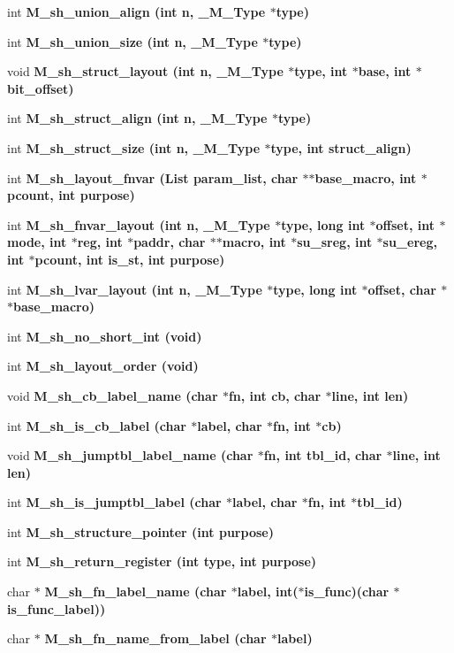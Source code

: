 \begin{CompactItemize}
\item 
int \bf{M\_\-sh\_\-union\_\-align} (int n, \bf{\_\-M\_\-Type} $\ast$type)
\item 
int \bf{M\_\-sh\_\-union\_\-size} (int n, \bf{\_\-M\_\-Type} $\ast$type)
\item 
void \bf{M\_\-sh\_\-struct\_\-layout} (int n, \bf{\_\-M\_\-Type} $\ast$type, int $\ast$base, int $\ast$bit\_\-offset)
\item 
int \bf{M\_\-sh\_\-struct\_\-align} (int n, \bf{\_\-M\_\-Type} $\ast$type)
\item 
int \bf{M\_\-sh\_\-struct\_\-size} (int n, \bf{\_\-M\_\-Type} $\ast$type, int struct\_\-align)
\item 
int \bf{M\_\-sh\_\-layout\_\-fnvar} (\bf{List} param\_\-list, char $\ast$$\ast$base\_\-macro, int $\ast$pcount, int purpose)
\item 
int \bf{M\_\-sh\_\-fnvar\_\-layout} (int n, \bf{\_\-M\_\-Type} $\ast$type, long int $\ast$offset, int $\ast$\bf{mode}, int $\ast$reg, int $\ast$paddr, char $\ast$$\ast$macro, int $\ast$su\_\-sreg, int $\ast$su\_\-ereg, int $\ast$pcount, int is\_\-st, int purpose)
\item 
int \bf{M\_\-sh\_\-lvar\_\-layout} (int n, \bf{\_\-M\_\-Type} $\ast$type, long int $\ast$offset, char $\ast$$\ast$base\_\-macro)
\item 
int \bf{M\_\-sh\_\-no\_\-short\_\-int} (void)
\item 
int \bf{M\_\-sh\_\-layout\_\-order} (void)
\item 
void \bf{M\_\-sh\_\-cb\_\-label\_\-name} (char $\ast$fn, int cb, char $\ast$line, int len)
\item 
int \bf{M\_\-sh\_\-is\_\-cb\_\-label} (char $\ast$label, char $\ast$fn, int $\ast$cb)
\item 
void \bf{M\_\-sh\_\-jumptbl\_\-label\_\-name} (char $\ast$fn, int tbl\_\-id, char $\ast$line, int len)
\item 
int \bf{M\_\-sh\_\-is\_\-jumptbl\_\-label} (char $\ast$label, char $\ast$fn, int $\ast$tbl\_\-id)
\item 
int \bf{M\_\-sh\_\-structure\_\-pointer} (int purpose)
\item 
int \bf{M\_\-sh\_\-return\_\-register} (int type, int purpose)
\item 
char $\ast$ \bf{M\_\-sh\_\-fn\_\-label\_\-name} (char $\ast$label, int($\ast$is\_\-func)(char $\ast$is\_\-func\_\-label))
\item 
char $\ast$ \bf{M\_\-sh\_\-fn\_\-name\_\-from\_\-label} (char $\ast$label)
\item 
$$
\end{CompactItemize}
